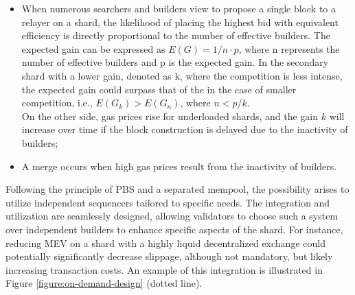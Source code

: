 \begin{itemize}
    \item When numerous searchers and builders view to propose a single block to a relayer on a shard, 
    the likelihood of placing the highest bid with equivalent efficiency is directly proportional 
    to the number of effective builders. 
    The expected gain can be expressed as $E(G) = 1/n \cdot p$, where 
    n represents the number of effective builders and p is the expected gain.
    In the secondary shard with a lower gain, denoted as k, where the competition is less intense, the expected gain could 
    surpass that of the \mainshard in the case of smaller competition, i.e., $E(G_k) > E(G_n)$, 
    where $n < p/k$. 
    \\On the other side, gas prices rise for underloaded shards, and the gain $k$ will increase over time if the block 
    construction is delayed due to the inactivity of builders;
    \item A merge occurs when high gas prices result from the inactivity of builders.
\end{itemize}

Following the principle of PBS and a separated mempool, the possibility arises to utilize 
independent sequencers tailored to specific needs. 
The integration and utilization are seamlessly designed, 
 allowing validators to choose such a system over independent builders 
 to enhance specific aspects of the shard.
For instance, reducing MEV on a shard with a highly liquid decentralized exchange could potentially significantly decrease slippage, 
 although not mandatory, but likely increasing transaction costs. 
An example of this integration is illustrated in Figure \ref{figure:on-demand-design} (dotted line).


\subsection{\mainshard}

